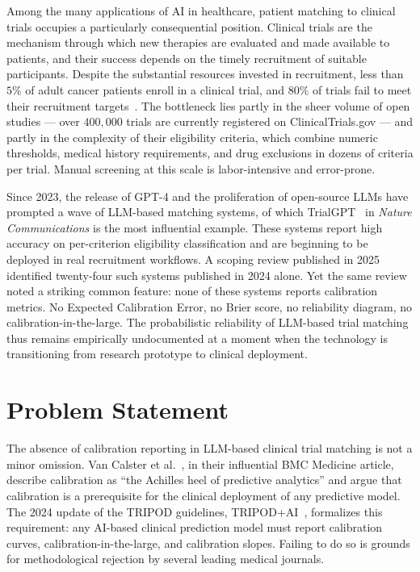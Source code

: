 Among the many applications of AI in healthcare, patient matching to 
clinical trials occupies a particularly consequential position. Clinical 
trials are the mechanism through which new therapies are evaluated and 
made available to patients, and their success depends on the timely 
recruitment of suitable participants. Despite the substantial resources 
invested in recruitment, less than $5\%$ of adult cancer patients enroll 
in a clinical trial, and $80\%$ of trials fail to meet their recruitment 
targets~\cite{jin2024trialgpt}. The bottleneck lies partly in the sheer 
volume of open studies --- over $400{,}000$ trials are currently 
registered on ClinicalTrials.gov --- and partly in the complexity of 
their eligibility criteria, which combine numeric thresholds, medical 
history requirements, and drug exclusions in dozens of criteria per 
trial. Manual screening at this scale is labor-intensive and 
error-prone.

Since 2023, the release of GPT-4 and the proliferation of open-source 
LLMs have prompted a wave of LLM-based matching systems, of which 
TrialGPT~\cite{jin2024trialgpt} in \emph{Nature Communications} is the 
most influential example. These systems report high accuracy on 
per-criterion eligibility classification and are beginning to be 
deployed in real recruitment workflows. A scoping review published in 
2025~\cite{chen2025scoping} identified twenty-four such systems 
published in 2024 alone. Yet the same review noted a striking common 
feature: none of these systems reports calibration metrics. No Expected 
Calibration Error, no Brier score, no reliability diagram, no 
calibration-in-the-large. The probabilistic reliability of LLM-based 
trial matching thus remains empirically undocumented at a moment when 
the technology is transitioning from research prototype to clinical 
deployment.

\section{Problem Statement}
\label{sec:intro-problem}

The absence of calibration reporting in LLM-based clinical trial 
matching is not a minor omission. Van Calster et 
al.~\cite{vancalster2019calibration}, in their influential BMC Medicine 
article, describe calibration as ``the Achilles heel of predictive 
analytics'' and argue that calibration is a prerequisite for the 
clinical deployment of any predictive model. The 2024 update of the 
TRIPOD guidelines, TRIPOD+AI~\cite{collins2024tripod}, formalizes this 
requirement: any AI-based clinical prediction model must report 
calibration curves, calibration-in-the-large, and calibration slopes. 
Failing to do so is grounds for methodological rejection by several 
leading medical journals.

